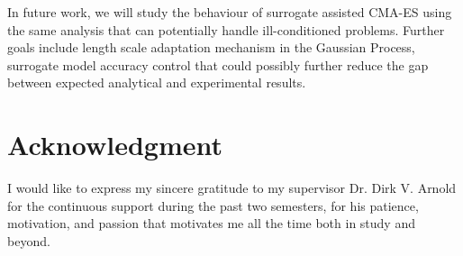In future work, we will study the behaviour of surrogate assisted CMA-ES using the same analysis that can potentially handle ill-conditioned problems. Further goals include length scale adaptation mechanism in the Gaussian Process, surrogate model accuracy control that could possibly further reduce the gap between expected analytical and experimental results. 

\section*{Acknowledgment}
I would like to express my sincere gratitude to my supervisor Dr. Dirk V. Arnold for the continuous support during the past two semesters, for his patience, motivation, and passion  that motivates me all the time both in study and beyond. 








